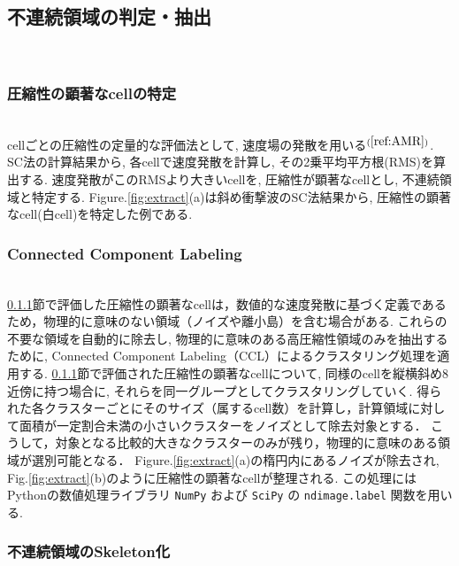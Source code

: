 \documentclass[a4j]{jarticle}
\begin{document}
\subsection{不連続領域の判定・抽出} \label{subsec:discon}
\mbox{}\\[-6.0ex]
\subsubsection{圧縮性の顕著なcellの特定} \label{subsubsec:comp}
\mbox{}\\[-1.0ex]

cellごとの圧縮性の定量的な評価法として, 速度場の発散を用いる$^{(\ref{ref:AMR})}$.
SC法の計算結果から, 各cellで速度発散を計算し, その2乗平均平方根(RMS)を算出する.
速度発散がこのRMSより大きいcellを, 圧縮性が顕著なcellとし, 不連続領域と特定する.
Figure.\ref{fig:extract}(a)は斜め衝撃波のSC法結果から, 圧縮性の顕著なcell(白cell)を特定した例である.

\subsubsection{Connected Component Labeling}\label{subsubsec:CCL}
\mbox{}\\[-1.0ex]

\ref{subsubsec:comp}節で評価した圧縮性の顕著なcellは，数値的な速度発散に基づく定義であるため，物理的に意味のない領域（ノイズや離小島）を含む場合がある.
これらの不要な領域を自動的に除去し, 物理的に意味のある高圧縮性領域のみを抽出するために, Connected Component Labeling（CCL）によるクラスタリング処理を適用する.
\ref{subsubsec:comp}節で評価された圧縮性の顕著なcellについて, 同様のcellを縦横斜め8近傍に持つ場合に, それらを同一グループとしてクラスタリングしていく.
得られた各クラスターごとにそのサイズ（属するcell数）を計算し，計算領域に対して面積が一定割合未満の小さいクラスターをノイズとして除去対象とする．
こうして，対象となる比較的大きなクラスターのみが残り，物理的に意味のある領域が選別可能となる．
Figure.\ref{fig:extract}(a)の楕円内にあるノイズが除去され, Fig.\ref{fig:extract}(b)のように圧縮性の顕著なcellが整理される.
この処理にはPythonの数値処理ライブラリ \texttt{NumPy} および \texttt{SciPy} の \texttt{ndimage.label} 関数を用いる.

\subsubsection{不連続領域のSkeleton化} \label{subsubsec:skeleton}
\mbox{}\\[-1.0ex]
\end{document}
